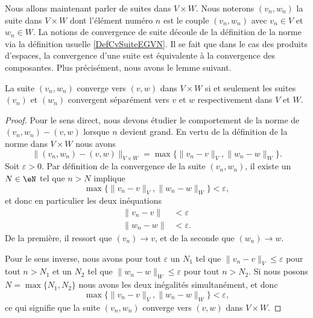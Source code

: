 Nous allons maintenant parler de suites dans $V\times W$. Nous noterons $(v_n,w_n)$ la suite dans $V\times W$ dont l'élément numéro $n$ est le couple $(v_n,w_n)$ avec $v_n\in V$ et $w_n\in W$. La notions de convergence de suite découle de la définition de la norme via la définition usuelle \ref{DefCvSuiteEGVN}. Il se fait que dans le cas des produits d'espaces, la convergence d'une suite est équivalente à la convergence des composantes. Plus précisément, nous avons le lemme suivant.
\begin{lemma}		\label{LemCvVxWcvVW}
	La suite $(v_n,w_n)$ converge vers $(v,w)$ dans $V\times W$ si et seulement les suites $(v_n)$ et $(w_n)$ convergent séparément vers $v$ et $w$ respectivement dans $V$ et $W$. 
\end{lemma}

\begin{proof}
	Pour le sens direct, nous devons étudier le comportement de la norme de $(v_n,w_n)-(v,w)$ lorsque $n$ devient grand. En vertu de la définition de la norme dans $V\times W$ nous avons
	\begin{equation}
		\Big\| (v_n,w_n)-(v,w) \Big\|_{V\times W}=\max\big\{ \| v_n-v \|_V,\| w_n-w \|_W \big\}.
	\end{equation}
	Soit $\varepsilon>0$. Par définition de la convergence de la suite $(v_n,w_n)$, il existe un $N\in\eN$ tel que $n>N$ implique
	\begin{equation}
		\max\big\{ \| v_n-v \|_V,\| w_n-w \|_W \big\}<\varepsilon,
	\end{equation}
	et donc en particulier les deux inéquations
	\begin{subequations}
		\begin{align}
			\| v_n-v \|&<\varepsilon\\
			\| w_n-w \|&<\varepsilon.
		\end{align}
	\end{subequations}
	De la première, il ressort que $(v_n)\to v$, et de la seconde que $(w_n)\to w$.

	Pour le sens inverse, nous avons pour tout $\varepsilon$ un $N_1$ tel que $\| v_n-v \|_V\leq\varepsilon$ pour tout $n>N_1$ et un $N_2$ tel que $\| w_n-w \|_W\leq\varepsilon$ pour tout $n>N_2$. Si nous posons $N=\max\{ N_1,N_2 \}$ nous avons les deux inégalités simultanément, et donc
	\begin{equation}
		\max\big\{ \| v_n-v \|_V,\| w_n-w \|_W \big\}<\varepsilon,
	\end{equation}
	ce qui signifie que la suite $(v_n,w_n)$ converge vers $(v,w)$ dans $V\times W$.
\end{proof}

